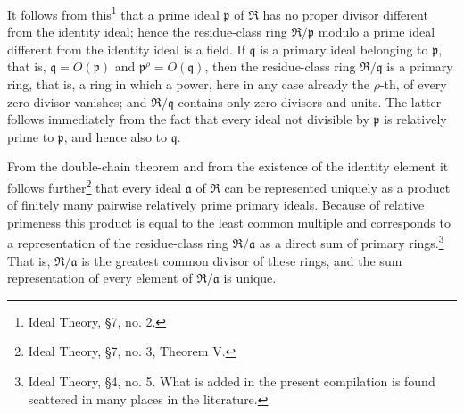 \documentclass[11pt]{article}
\begin{document}
It follows from this\footnote{Ideal Theory, \S 7, no. 2.} that a prime ideal $\mathfrak p$ of $\mathfrak R$ has no proper divisor different from the identity ideal; hence the residue-class ring $\mathfrak R/\mathfrak p$ modulo a prime ideal different from the identity ideal is a field. If $\mathfrak q$ is a primary ideal belonging to $\mathfrak p$, that is, $\mathfrak q=O(\mathfrak p)$ and $\mathfrak p^{\rho}=O(\mathfrak q)$, then the residue-class ring $\mathfrak R/\mathfrak q$ is a primary ring, that is, a ring in which a power, here in any case already the $\rho$-th, of every zero divisor vanishes; and $\mathfrak R/\mathfrak q$ contains only zero divisors and units. The latter follows immediately from the fact that every ideal not divisible by $\mathfrak p$ is relatively prime to $\mathfrak p$, and hence also to $\mathfrak q$.

From the double-chain theorem and from the existence of the identity element it follows further\footnote{Ideal Theory, \S 7, no. 3, Theorem V.} that every ideal $\mathfrak a$ of $\mathfrak R$ can be represented uniquely as a product of finitely many pairwise relatively prime primary ideals. Because of relative primeness this product is equal to the least common multiple and corresponds to a representation of the residue-class ring $\mathfrak R/\mathfrak a$ as a direct sum of primary rings.\footnote{Ideal Theory, \S 4, no. 5. What is added in the present compilation is found scattered in many places in the literature.} That is, $\mathfrak R/\mathfrak a$ is the greatest common divisor of these rings, and the sum representation of every element of $\mathfrak R/\mathfrak a$ is unique.
\end{document}
